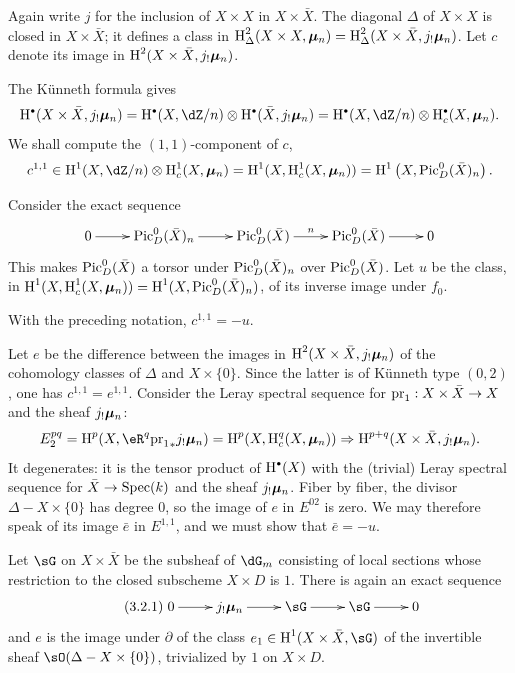 Again write $j$ for the inclusion of $X\times X$ in $X\times \bar X$. The
diagonal $\Delta$ of $X\times X$ is closed in $X\times \bar X$; it defines a
class in
$\operatorname{H}_\Delta^2(X\times X,{\bm\mu}_n)=\operatorname{H}_\Delta^2(X\times \bar X,j_!{\bm\mu}_n)$. Let
$c$ denote its image in $\operatorname{H}^2(X\times \bar X,j_!{\bm\mu}_n)$.

The K\"unneth formula gives
\[
  \h^\bullet(X\times \bar X,j_!\dmu_n) = \h^\bullet(X,\dZ/n)\otimes \h^\bullet(\bar X,j_!\dmu_n) = \h^\bullet(X,\dZ/n)\otimes \h_c^\bullet(X,\dmu_n) \text{.}
\]
We shall compute the $(1,1)$-component of $c$,
\[
  c^{1,1} \in \h^1(X,\dZ/n)\otimes \h_c^1(X,\dmu_n) = \h^1(X,\h_c^1(X,\dmu_n)) = \h^1\left(X,\pic_D^0(\bar X)_n\right) \text{.}
\]

Consider the exact sequence
\[\xymatrix{
  0 \ar[r]
    & \pic_D^0(\bar X)_n \ar[r]
    & \pic_D^0(\bar X) \ar[r]^n
    & \pic_D^0(\bar X) \ar[r]
    & 0
}\]
This makes $\operatorname{Pic}_D^0(\bar X)$ a torsor under $\operatorname{Pic}_D^0(\bar X)_n$ over
$\operatorname{Pic}_D^0(\bar X)$. Let $u$ be the class, in
$\operatorname{H}^1(X,\operatorname{H}_c^1(X,{\bm\mu}_n))=\operatorname{H}^1(X,\operatorname{Pic}_D^0(\bar X)_n)$, of its inverse image
under $f_0$.


\begin{proposition_}\label{V:3-2}
With the preceding notation, $c^{1,1}=-u$.
\end{proposition_}

Let $e$ be the difference between the images in
$\operatorname{H}^2(X\times \bar X,j_!{\bm\mu}_n)$ of the cohomology classes of $\Delta$ and
$X\times\{0\}$. Since the latter is of K\"unneth type $(0,2)$, one has
$c^{1,1}=e^{1,1}$. Consider the Leray spectral sequence for
$\mathrm{pr}_1:X\times \bar X\to X$ and the sheaf $j_!{\bm\mu}_n$:
\[
  E_2^{pq} = \h^p(X,\eR^q {\pr_1}_\ast j_!\dmu_n) = \h^p(X,\h_c^q(X,\dmu_n)) \Rightarrow \h^{p+q}(X\times \bar X,j_!\dmu_n) \text{.}
\]
It degenerates: it is the tensor product of $\h^\bullet(X)$ with the
(trivial) Leray spectral sequence for $\bar X\to \operatorname{Spec}(k)$ and the sheaf
$j_!{\bm\mu}_n$. Fiber by fiber, the divisor $\Delta-X\times\{0\}$ has degree
$0$, so the image of $e$ in $E^{02}$ is zero. We may therefore speak of its
image $\bar e$ in $E^{1,1}$, and we must show that $\bar e = -u$.

Let $\sG$ on $X\times\bar X$ be the subsheaf of $\dG_m$ consisting of local
sections whose restriction to the closed subscheme $X\times D$ is $1$.
There is again an exact sequence
\begin{equation*}\tag{3.2.1}\label{V:eq:3-2-1}
\xymatrix{
  0 \ar[r]
    & j_!\dmu_n \ar[r]
    & \sG \ar[r]
    & \sG \ar[r]
    & 0
}
\end{equation*}
and $e$ is the image under $\partial$ of the class
$e_1\in \h^1(X\times\bar X,\sG)$ of the invertible sheaf
$\sO(\Delta-X\times\{0\})$, trivialized by $1$ on $X\times D$.

